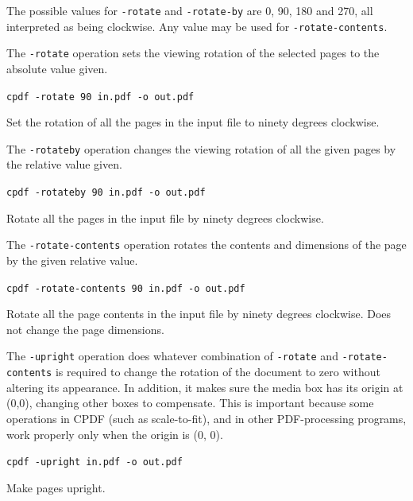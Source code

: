 \documentclass{book}
\begin{document}
  The possible values for \texttt{-rotate} and \texttt{-rotate-by} are 0, 90,
180 and 270, all interpreted as being clockwise. Any value may be used for
\texttt{-rotate-contents}.
  
The \texttt{-rotate} operation sets the viewing rotation of the selected pages to
the absolute value given.
  \begin{framed}
  \noindent\small\verb!cpdf -rotate 90 in.pdf -o out.pdf!

  \vspace{2.5mm}
  \noindent Set the rotation of all the pages in the input file to ninety degrees clockwise.
  \end{framed}
  \noindent The \texttt{-rotateby} operation changes the viewing rotation of all the
given pages by the relative value given.
  \begin{framed}
  \noindent\small\verb!cpdf -rotateby 90 in.pdf -o out.pdf!

  \vspace{2.5mm}
  \noindent Rotate all the pages in the input file by ninety degrees clockwise.
  \end{framed}
  \noindent The \texttt{-rotate-contents} operation rotates the contents and dimensions
of the page by the given relative value.
  \begin{framed}
  \noindent\small\verb!cpdf -rotate-contents 90 in.pdf -o out.pdf!

  \vspace{2.5mm}

  \noindent Rotate all the page contents in the input file by
ninety degrees clockwise. Does not change the page dimensions.
  \end{framed}

  \label{upright}
   \noindent The \texttt{-upright} operation does whatever combination of
\texttt{-rotate} and \texttt{-rotate-contents} is required to change the
rotation of the document to zero without altering its appearance. In addition, it makes sure the media box has its origin at (0,0), changing other boxes to compensate. This is important because some operations in CPDF (such as scale-to-fit), and in other PDF-processing programs, work properly only when the origin is (0, 0).

  \begin{framed}
  \noindent\small\verb!cpdf -upright in.pdf -o out.pdf!

  \vspace{2.5mm}

  \noindent Make pages upright.
  \end{framed}
\end{document}
